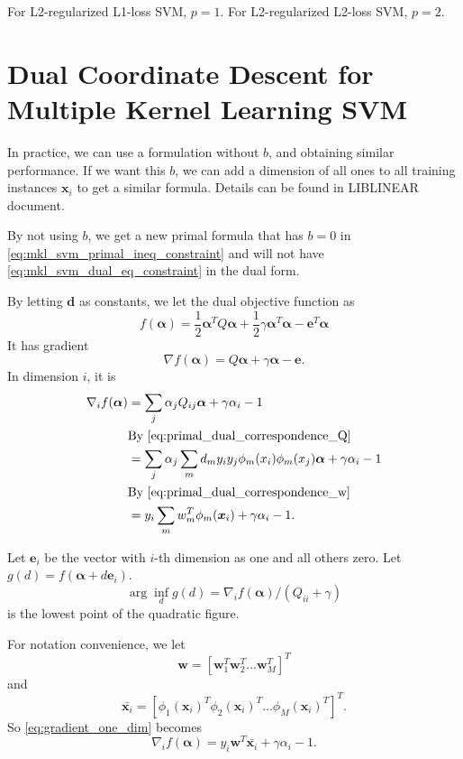 \documentclass[12pt]{article}
\def\bw{{\boldsymbol w}}
\def\balpha{{\boldsymbol \alpha}}
\def\bd{{\boldsymbol d}}
\def\be{{\boldsymbol e}}
\def\bx{{\boldsymbol x}}
\def\liblinear{{\sf LIBLINEAR}\xspace}
\begin{document}
For L2-regularized L1-loss SVM, $p=1$.
For L2-regularized L2-loss SVM, $p=2$.

\section{Dual Coordinate Descent for Multiple Kernel Learning SVM}

In practice, we can use a formulation without $b$, and obtaining similar performance. 
If we want this $b$, we can add a dimension of all ones to all training instances $\bx_i$ to get a similar formula. 
Details can be found in \liblinear document.



By not using $b$, we get a new primal formula that has 
$b=0$ in \eqref{eq:mkl_svm_primal_ineq_constraint} 
and will not have \eqref{eq:mkl_svm_dual_eq_constraint} in the dual form.




By letting $\bd$ as constants, we let the dual objective function as
$$ f(\balpha) = \frac{1}{2} \balpha^T Q \balpha + \frac{1}{2} \gamma \balpha^T \balpha - \be^T \balpha  $$
It has gradient 
$$ \nabla f(\balpha) = Q \balpha + \gamma \balpha - \be \mbox{.} $$
In dimension $i$, it is
\begin{align}
\label{eq:gradient_one_dim}
\nabla_i f(\balpha) & = \sum_j \alpha_j Q_{ij} \balpha + \gamma \alpha_i  - 1 \\
                    &  \mbox{By \eqref{eq:primal_dual_correspondence_Q}} \\
                    & = \sum_j \alpha_j \sum_m d_m y_i y_j \phi_m(x_i) \phi_m(x_j) \balpha + \gamma \alpha_i  - 1 \\
                     & \mbox{By \eqref{eq:primal_dual_correspondence_w}} \\
                     & = y_i \sum_m w_m^T \phi_m(\bx_i) + \gamma \alpha_i -1 \mbox{.}
\end{align}

Let $\be_i$ be the vector with $i$-th dimension as one and all others zero.
Let $g(d) = f(\balpha + d\be_i)$. 
\begin{equation}
\label{eq:second_order_opt}
\arg \inf_d g(d) =  \nabla_i f(\balpha) /(Q_{ii} + \gamma)
\end{equation}
  is the lowest point of the quadratic figure.




For notation convenience, we let $$\bw = [\bw_1^T \bw_2^T \ldots \bw_M^T]^T$$
and $$\bar{\bx_i} = [\phi_1(\bx_i)^T \phi_2(\bx_i)^T \ldots \phi_M(\bx_i)^T]^T \mbox{.}$$ 
So \eqref{eq:gradient_one_dim} becomes
\begin{equation}
\label{eq:gradient_one_dim_simplified}
\nabla_i f(\balpha)  = y_i \bw^T \bar{\bx_i} + \gamma \alpha_i  - 1 \mbox{.}
\end{equation}
\end{document}
